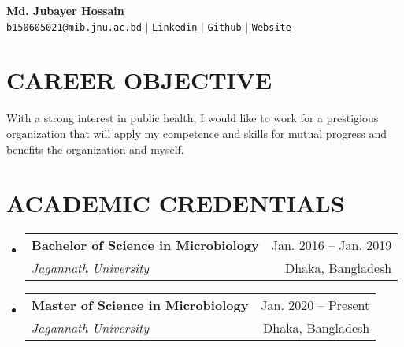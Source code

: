\documentclass[letterpaper,11pt]{article}
\makeatletter
\newcommand{\myuline}[1]{%
  \uline{\phantom{#1}}%
  \llap{\contour{white}{#1}}%
}
\newcommand{\resumeItem}[1]{
  \item\small{
    {#1 \vspace{-1pt}}
  }
}
\newcommand{\resumeSubheading}[4]{
  \vspace{-1pt}\item
    \begin{tabular*}{\textwidth}[t]{l@{\extracolsep{\fill}}r}
      \textbf{#1} & {\color{dark-grey}\small #2}\vspace{1pt}\\ %
      \textit{#3} & {\color{dark-grey} \small #4}\\ %
    \end{tabular*}\vspace{-4pt}
}
\newcommand{\resumeSubHeadingListStart}{\begin{itemize}[leftmargin=0in, label={}]}
\newcommand{\resumeSubHeadingListEnd}{\end{itemize}}
\newcommand{\resumeItemListStart}{\begin{itemize}}
\newcommand{\resumeItemListEnd}{\end{itemize}\vspace{0pt}}
\makeatother
\begin{document}
\setlength{\parskip}{0pt}
\begin{center}
    \textbf{\Huge Md. Jubayer Hossain} \\ \vspace{5pt} 
    \hspace{1pt} \faEnvelope \hspace{2pt} \texttt{\url{b150605021@mib.jnu.ac.bd}} $|$
	\hspace{1pt} \faLinkedin \hspace{2pt} \texttt{\href{https://www.linkedin.com/in/jubayer28/}{Linkedin}} 
    \hspace{1pt} $|$ 
    \hspace{1pt} \faGithub \hspace{2pt} \texttt{\href{https://github.com/hossainlab}{Github}} \hspace{1pt} $|$
    \hspace{1pt} \faGlobe \hspace{2pt}\texttt{\href{http://jhossain.com/}{Website}}
    \\ \vspace{-3pt}
\end{center}

\section{CAREER OBJECTIVE}
\justifying
With a strong interest in public health, I would like to work for a prestigious organization that will apply my competence and skills for mutual progress and benefits the organization and myself.

\section{ACADEMIC CREDENTIALS}
\resumeSubHeadingListStart
\resumeSubheading
{Bachelor of Science in Microbiology}{Jan. 2016 -- Jan. 2019}
{Jagannath University}{Dhaka, Bangladesh}

\resumeSubheading
{Master of Science in Microbiology}{Jan. 2020 -- Present}
{Jagannath University}{Dhaka, Bangladesh}
\resumeSubHeadingListEnd
\end{document}
